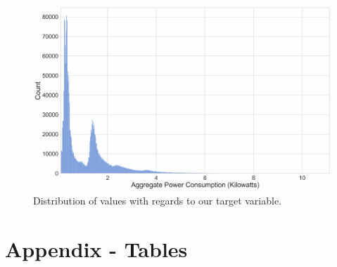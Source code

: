 \begin{figure}[hbt!]
    \centering
    \includegraphics[width=\textwidth]{Images/Chapter 5/Stage 3/UCID/UCID-GAP-Distribution.pdf}
    \caption{Distribution of values with regards to our target variable.}
    \label{fig:UCID-GAP-Distribution}
\end{figure}

\chapter{Appendix - Tables}
\label{ch:Appendix:Tables}

